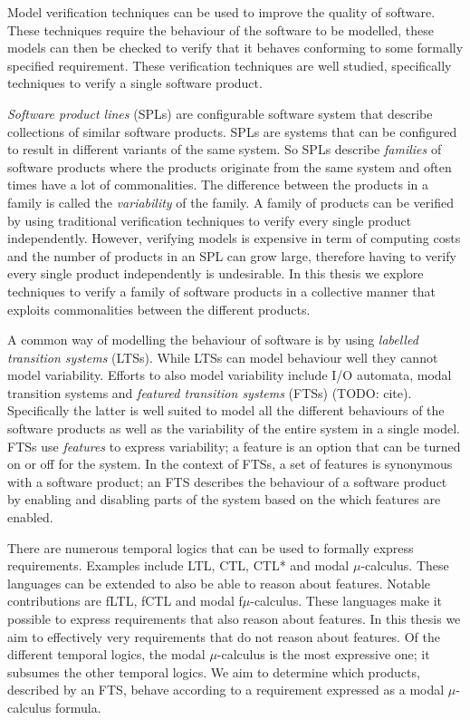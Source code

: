 Model verification techniques can be used to improve the quality of software. These techniques require the behaviour of the software to be modelled, these models can then be checked to verify that it behaves conforming to some formally specified requirement. These verification techniques are well studied, specifically techniques to verify a single software product.

\textit{Software product lines} (SPLs) are configurable software system that describe collections of similar software products. SPLs are systems that can be configured to result in different variants of the same system. So SPLs describe \textit{families} of software products where the products originate from the same system and often times have a lot of commonalities. The difference between the products in a family is called the \textit{variability} of the family. A family of products can be verified by using traditional verification techniques to verify every single product independently. However, verifying models is expensive in term of computing costs and the number of products in an SPL can grow large, therefore having to verify every single product independently is undesirable. In this thesis we explore techniques to verify a family of software products in a collective manner that exploits commonalities between the different products.

A common way of modelling the behaviour of software is by using \textit{labelled transition systems} (LTSs). While LTSs can model behaviour well they cannot model variability. Efforts to also model variability include I/O automata, modal transition systems and \textit{featured transition systems} (FTSs) (TODO: cite). Specifically the latter is well suited to model all the different behaviours of the software products as well as the variability of the entire system in a single model. FTSs use \textit{features} to express variability; a feature is an option that can be turned on or off for the system. In the context of FTSs, a set of features is synonymous with a software product; an FTS describes the behaviour of a software product by enabling and disabling parts of the system based on the which features are enabled.

There are numerous temporal logics that can be used to formally express requirements. Examples include LTL, CTL, CTL* and modal $\mu$-calculus. These languages can be extended to also be able to reason about features. Notable contributions are fLTL, fCTL and modal f$\mu$-calculus. These languages make it possible to express requirements that also reason about features. In this thesis we aim to effectively very requirements that do not reason about features. Of the different temporal logics, the modal $\mu$-calculus is the most expressive one; it subsumes the other temporal logics. We aim to determine which products, described by an FTS, behave according to a requirement expressed as a modal $\mu$-calculus formula.

